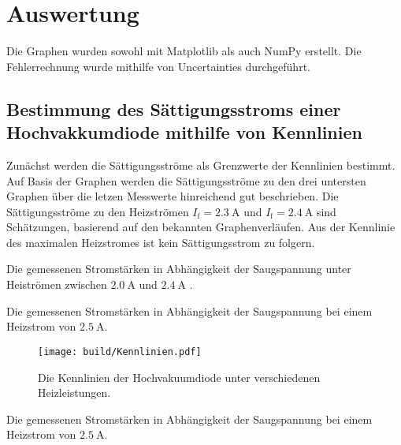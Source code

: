 \section{Auswertung}
\label{sec:Auswertung}

Die Graphen wurden sowohl mit Matplotlib \cite{matplotlib} als auch NumPy \cite{numpy} erstellt. Die
 Fehlerrechnung wurde mithilfe von Uncertainties \cite{uncertainties} durchgeführt.


 \subsection{Bestimmung des Sättigungsstroms einer Hochvakkumdiode mithilfe von Kennlinien}
Zunächst werden die Sättigungsströme als Grenzwerte der Kennlinien bestimmt. Auf Basis der Graphen werden die
Sättigungsströme zu den drei untersten Graphen über die letzen Messwerte hinreichend
gut beschrieben. Die Sättigungsströme zu den Heizströmen $I_\text{f} = \SI{2.3}{\ampere}$ und $I_\text{f} = \SI{2.4}{\ampere}$
sind Schätzungen, basierend auf den bekannten Graphenverläufen. Aus der Kennlinie
des maximalen Heizstromes ist kein Sättigungsstrom zu folgern.

 \begin{table}
 	\centering
 	\caption{Die gemessenen Stromstärken in Abhängigkeit der Saugspannung unter Heiströmen zwischen $\SI{2,0}{\ampere}$ und $\SI{2,4}{\ampere}$ .}
 	
 \end{table}

 \begin{table}
  \centering
  \caption{Die gemessenen Stromstärken in Abhängigkeit der Saugspannung bei einem Heizstrom von $\SI{2,5}{\ampere}$.}
  
  
 \end{table}

 \begin{figure}
 	\centering
 	\caption{Die Kennlinien der Hochvakuumdiode unter verschiedenen Heizleistungen.}
 	\texttt{[image: build/Kennlinien.pdf]}
 	\label{fig:Graph}
 \end{figure}

 \begin{table}
  \centering
  \caption{Die gemessenen Stromstärken in Abhängigkeit der Saugspannung bei einem Heizstrom von $\SI{2,5}{\ampere}$.}
  
 \end{table}




